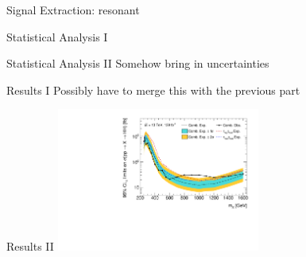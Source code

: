 \documentclass[11pt, xcolor={dvipsnames}, aspectratio=169]{beamer}
\begin{document}

\begin{frame}{Signal Extraction: resonant}
\end{frame}


\begin{frame}{Statistical Analysis I}
\end{frame}


\begin{frame}{Statistical Analysis II}
  Somehow bring in uncertainties
\end{frame}


\begin{frame}{Results I}
  Possibly have to merge this with the previous part
\end{frame}


\begin{frame}{Results II}
  \includegraphics[width=0.5\textwidth]{results_res/resonant_upper_limits}
\end{frame}

\end{document}

